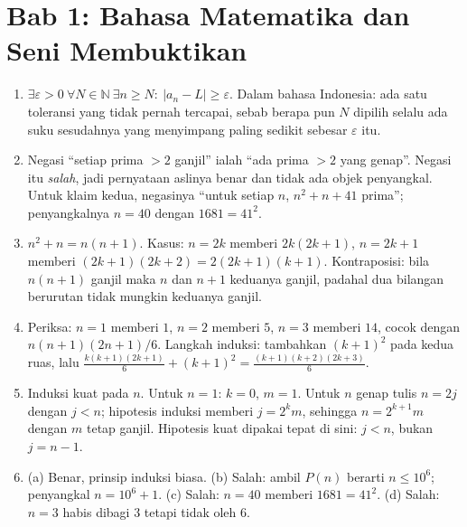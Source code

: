 
\section*{Bab 1: Bahasa Matematika dan Seni Membuktikan}
\begin{enumerate}[label=\textbf{1.\arabic*}]
  \item $\exists \varepsilon>0\ \forall N\in\mathbb{N}\ \exists n\ge N:\ |a_{n}-L|\ge
        \varepsilon$. Dalam bahasa Indonesia: ada satu toleransi yang tidak pernah
        tercapai, sebab berapa pun $N$ dipilih selalu ada suku sesudahnya yang
        menyimpang paling sedikit sebesar $\varepsilon$ itu.

  \item Negasi ``setiap prima $>2$ ganjil'' ialah ``ada prima $>2$ yang genap''.
        Negasi itu \emph{salah}, jadi pernyataan aslinya benar dan tidak ada objek
        penyangkal. Untuk klaim kedua, negasinya ``untuk setiap $n$,
        $n^{2}+n+41$ prima''; penyangkalnya $n=40$ dengan $1681=41^{2}$.

  \item $n^{2}+n=n(n+1)$. Kasus: $n=2k$ memberi $2k(2k+1)$, $n=2k+1$ memberi
        $(2k+1)(2k+2)=2(2k+1)(k+1)$. Kontraposisi: bila $n(n+1)$ ganjil maka $n$
        dan $n+1$ keduanya ganjil, padahal dua bilangan berurutan tidak mungkin
        keduanya ganjil.

  \item Periksa: $n=1$ memberi $1$, $n=2$ memberi $5$, $n=3$ memberi $14$, cocok
        dengan $n(n+1)(2n+1)/6$. Langkah induksi: tambahkan $(k+1)^{2}$ pada kedua
        ruas, lalu
        $\frac{k(k+1)(2k+1)}{6}+(k+1)^{2}=\frac{(k+1)(k+2)(2k+3)}{6}$.

  \item Induksi kuat pada $n$. Untuk $n=1$: $k=0$, $m=1$. Untuk $n$ genap tulis
        $n=2j$ dengan $j<n$; hipotesis induksi memberi $j=2^{k}m$, sehingga
        $n=2^{k+1}m$ dengan $m$ tetap ganjil. Hipotesis kuat dipakai tepat di sini:
        $j<n$, bukan $j=n-1$.

  \item (a) Benar, prinsip induksi biasa. (b) Salah: ambil $P(n)$ berarti
        $n\le 10^{6}$; penyangkal $n=10^{6}+1$. (c) Salah: $n=40$ memberi
        $1681=41^{2}$. (d) Salah: $n=3$ habis dibagi $3$ tetapi tidak oleh $6$.


\end{enumerate}
